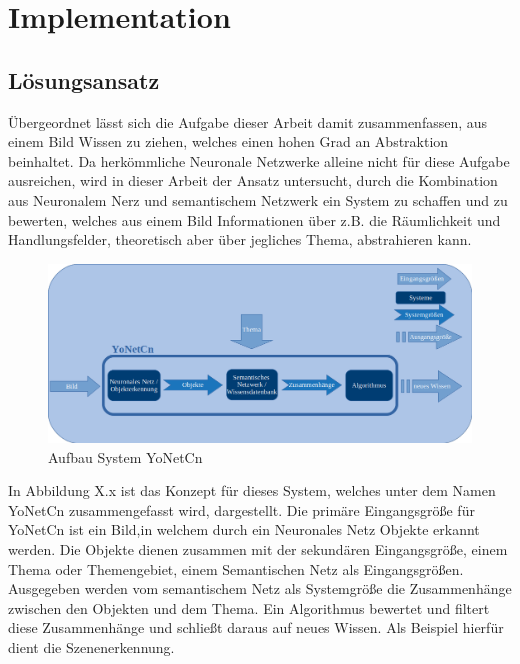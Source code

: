 \chapter{Implementation}
\label{sec:implementation}

\section{Lösungsansatz}
\label{sec:Lösung}

Übergeordnet lässt sich die Aufgabe dieser Arbeit damit zusammenfassen, aus einem Bild Wissen zu ziehen, welches einen hohen Grad an Abstraktion beinhaltet. Da herkömmliche Neuronale Netzwerke alleine nicht für diese Aufgabe ausreichen, wird in dieser Arbeit der Ansatz untersucht, durch die Kombination aus Neuronalem Nerz und semantischem Netzwerk ein System zu schaffen und zu bewerten, welches aus einem Bild Informationen über z.B. die Räumlichkeit und Handlungsfelder, theoretisch aber über jegliches Thema, abstrahieren kann. 


\begin{figure}[h]
	
	\begin{center}
		
		\includegraphics[width=14cm]{images/Masteridee.png}
		
		\caption{Aufbau System YoNetCn}
		
		\label{system_Bild}
		
	\end{center}
	
	
\end{figure}


In Abbildung X.x ist das Konzept für dieses System, welches unter dem Namen YoNetCn zusammengefasst wird, dargestellt. Die primäre Eingangsgröße für YoNetCn ist ein Bild,in welchem durch ein Neuronales Netz Objekte erkannt werden. Die Objekte dienen zusammen mit der sekundären Eingangsgröße, einem Thema oder Themengebiet, einem Semantischen Netz als Eingangsgrößen. Ausgegeben werden vom semantischem Netz als Systemgröße die Zusammenhänge zwischen den Objekten und dem Thema. Ein Algorithmus bewertet und filtert diese Zusammenhänge und schließt daraus auf neues Wissen. Als Beispiel hierfür dient die Szenenerkennung. 



